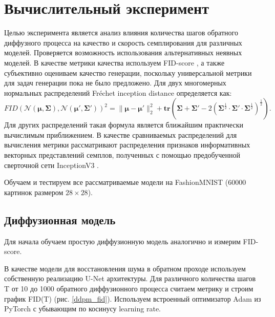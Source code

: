 \documentclass{article}
\begin{document}
 \section{Вычислительный эксперимент}
Целью эксперимента является анализ влияния количества шагов обратного диффузного процесса на качество и скорость семплирования для различных моделей. Проверяется возможность использования альтернативных неявных моделей. В качестве метрики качества используем FID-score \cite{https://doi.org/10.48550/arxiv.1706.08500}, а также субъективно оцениваем качество генерации, поскольку универсальной метрики для задач генерации пока не было предложено. Для двух многомерных нормальных распределений Fréchet inception distance определяется как:
 \begin{equation}
	FID({\mathcal {N}}(\mathbf{\mu},\mathbf{\Sigma}),{\mathcal {N}}(\mathbf{\mu} ',\mathbf{\Sigma} '))^{2}=\lVert \mathbf{\mu} -\mathbf{\mu} '\rVert _{2}^{2}+\mathbf{tr} \left(\mathbf{\Sigma} +\mathbf{\Sigma} '-2\left(\mathbf{\Sigma} ^{\frac {1}{2}}\cdot \mathbf{\Sigma} '\cdot \mathbf{\Sigma} ^{\frac {1}{2}}\right)^{\frac {1}{2}}\right).
\end{equation}
Для других распределений такая формула является ближайшим практически вычислимым приближением. В качестве сравниваемых распределений для вычисления метрики рассматривают распределения признаков информативных векторных представлений семплов, полученных с помощью предобученной сверточной сети InceptionV3 \cite{szegedy2015rethinking}.

 Обучаем и тестируем все рассматриваемые модели на FashionMNIST \cite{xiao2017fashionmnist} (60000 картинок размером $28\times 28$).


\subsection{Диффузионная модель}
Для начала обучаем простую диффузионную модель аналогично \cite{https://doi.org/10.48550/arxiv.2006.11239} и измерим FID-score.

В качестве модели для восстановления шума в обратном проходе используем собственную реализацию U-Net \cite{ronneberger2015unet} архитектуры. Для различного количества шагов T от 10 до 1000 обратного диффузионного процесса считаем метрику и строим график  FID(T) (рис. \ref{ddpm_fid}). Используем встроенный оптимизатор Adam из PyTorch с убывающим по косинусу learning rate.
\end{document}
